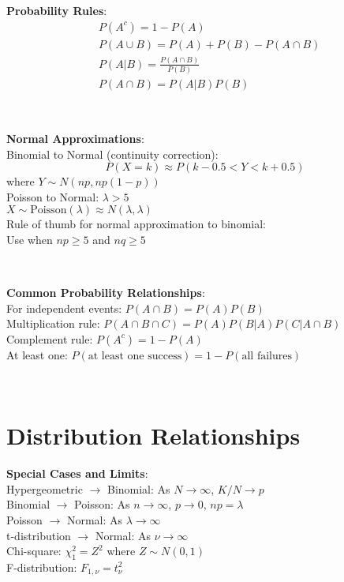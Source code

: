 \documentclass{article}
\newenvironment{cheatformula}[1][Title]{
    \begin{minipage}{\linewidth}
    \textbf{#1}:\\
}{
    \end{minipage}\\[2ex]
}
\begin{document}
\begin{multicols*}{2}
\begin{cheatformula}[Probability Rules]
    \begin{align*}
        &P(A^c) = 1 - P(A)\\
        &P(A \cup B) = P(A) + P(B) - P(A \cap B)\\
        &P(A|B) = \frac{P(A \cap B)}{P(B)}\\
        &P(A \cap B) = P(A|B)P(B)
    \end{align*}
\end{cheatformula}

\begin{cheatformula}[Normal Approximations]
    Binomial to Normal (continuity correction):
    $$P(X = k) \approx P(k-0.5 < Y < k+0.5)$$
    where $Y \sim N(np, np(1-p))$\\
    
    Poisson to Normal: $\lambda > 5$\\
    $X \sim \text{Poisson}(\lambda) \approx N(\lambda, \lambda)$\\
    
    Rule of thumb for normal approximation to binomial:\\
    Use when $np \geq 5$ and $nq \geq 5$
\end{cheatformula}

\begin{cheatformula}[Common Probability Relationships]
    For independent events: $P(A \cap B) = P(A)P(B)$\\
    
    Multiplication rule: $P(A \cap B \cap C) = P(A)P(B|A)P(C|A \cap B)$\\
    
    Complement rule: $P(A^c) = 1 - P(A)$\\
    
    At least one: $P(\text{at least one success}) = 1 - P(\text{all failures})$
\end{cheatformula}

\section{Distribution Relationships}

\begin{cheatformula}[Special Cases and Limits]
    Hypergeometric $\to$ Binomial: As $N \to \infty$, $K/N \to p$\\
    
    Binomial $\to$ Poisson: As $n \to \infty$, $p \to 0$, $np = \lambda$\\
    
    Poisson $\to$ Normal: As $\lambda \to \infty$\\
    
    t-distribution $\to$ Normal: As $\nu \to \infty$\\
    
    Chi-square: $\chi^2_1 = Z^2$ where $Z \sim N(0,1)$\\
    
    F-distribution: $F_{1,\nu} = t_\nu^2$
\end{cheatformula}

\end{multicols*}
\newpage
\end{document}
